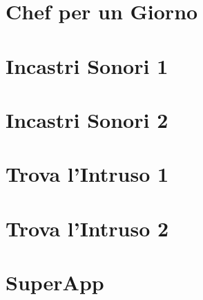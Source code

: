 \documentclass[12pt,a4paper]{report} %
\begin{document}


\setcounter{tocdepth}{0}
\tableofcontents
\setcounter{tocdepth}{2}

\setcounter{page}{1}



\chapter{Chef per un Giorno}


\chapter{Incastri Sonori 1}


\chapter{Incastri Sonori 2}


\chapter{Trova l'Intruso 1}


\chapter{Trova l'Intruso 2}


\chapter{SuperApp}

\end{document}
